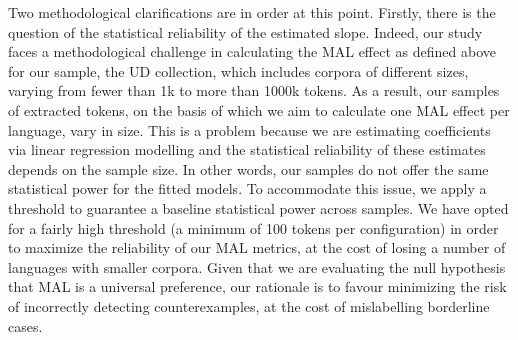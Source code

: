 Two methodological clarifications are in order at this point. Firstly, there is the question of the statistical reliability of the estimated slope. Indeed, our study faces a methodological challenge in calculating the MAL effect as defined above for our sample, the UD collection, which includes corpora of different sizes, varying from fewer than 1k to more than 1000k tokens. As a result, our samples of extracted tokens, on the basis of which we aim to calculate one MAL effect per language, vary in size. This is a problem because we are estimating coefficients via linear regression modelling and the statistical reliability of these estimates depends on the sample size. In other words, our samples do not offer the same statistical power for the fitted models. To accommodate this issue, we apply a threshold to guarantee a baseline statistical power across samples. We have opted for a fairly high threshold (a minimum of 100 tokens per configuration) in order to maximize the reliability of our MAL metrics, at the cost of losing a number of languages with smaller corpora. Given that we are evaluating the null hypothesis that MAL is a universal preference, our rationale is to favour minimizing the risk of incorrectly detecting counterexamples, at the cost of mislabelling borderline cases.

